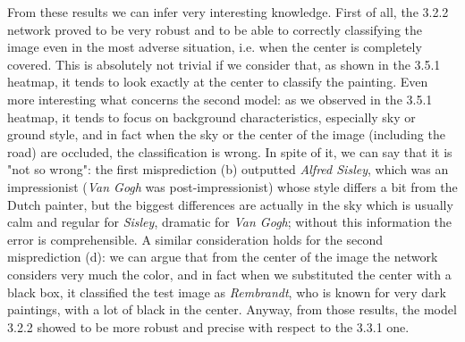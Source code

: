 \medskip

\noindent From these results we can infer very interesting knowledge. First of all, the 3.2.2 network proved to be very robust and to be able to correctly classifying the image even in the most adverse situation, i.e. when the center is completely covered. This is absolutely not trivial if we consider that, as shown in the 3.5.1 heatmap, it tends to look exactly at the center to classify the painting. Even more interesting what concerns the second model: as we observed in the 3.5.1 heatmap, it tends to focus on background characteristics, especially sky or ground style, and in fact when the sky or the center of the image (including the road) are occluded, the classification is wrong. In spite of it, we can say that it is "not so wrong": the first misprediction (b) outputted \textit{Alfred Sisley}, which was an impressionist (\textit{Van Gogh} was post-impressionist) whose style differs a bit from the Dutch painter, but the biggest differences are actually in the sky which is usually calm and regular for \textit{Sisley}, dramatic for \textit{Van Gogh}; without this information the error is comprehensible. A similar consideration holds for the second misprediction (d): we can argue that from the center of the image the network considers very much the color, and in fact when we substituted the center with a black box, it classified the test image as \textit{Rembrandt}, who is known for very dark paintings, with a lot of black in the center.
Anyway, from those results, the model 3.2.2 showed to be more robust and precise with respect to the 3.3.1 one. 